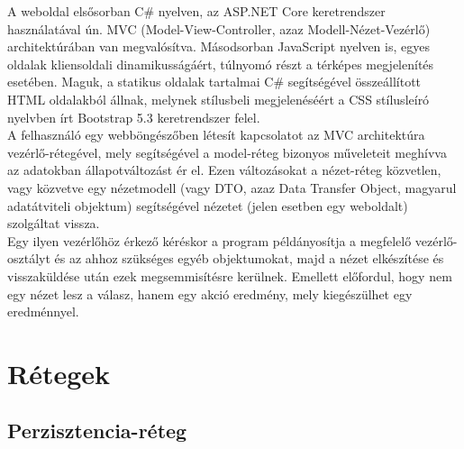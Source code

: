 A weboldal elsősorban C\# nyelven, az ASP.NET Core keretrendszer használatával ún. MVC (Model-View-Controller, azaz Modell-Nézet-Vezérlő) architektúrában van megvalósítva. Másodsorban JavaScript nyelven is, egyes oldalak kliensoldali dinamikusságáért, túlnyomó részt a térképes megjelenítés esetében. Maguk, a statikus oldalak tartalmai C\# segítségével összeállított HTML oldalakból állnak, melynek stílusbeli megjelenéséért a CSS stílusleíró nyelvben írt Bootstrap 5.3 keretrendszer felel.\\
A felhasználó egy webböngészőben létesít kapcsolatot az MVC architektúra vezérlő-rétegével, mely segítségével a model-réteg bizonyos műveleteit meghívva az adatokban állapotváltozást ér el. Ezen változásokat a nézet-réteg közvetlen, vagy közvetve egy nézetmodell (vagy DTO, azaz Data Transfer Object, magyarul adatátviteli objektum) segítségével nézetet (jelen esetben egy weboldalt) szolgáltat vissza.\\
Egy ilyen vezérlőhöz érkező kéréskor a program példányosítja a megfelelő vezérlő-osztályt és az ahhoz szükséges egyéb objektumokat, majd a nézet elkészítése és visszaküldése után ezek megsemmisítésre kerülnek. Emellett előfordul, hogy nem egy nézet lesz a válasz, hanem egy akció eredmény, mely kiegészülhet egy eredménnyel.

\section{Rétegek}

\subsection{Perzisztencia-réteg}
\label{subsec:persistence}


